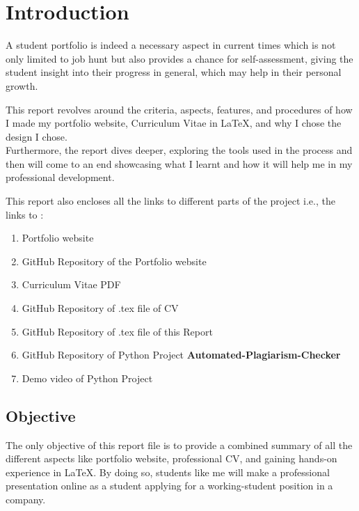 \documentclass{report}
\begin{document}
 

\tableofcontents
\newpage


\chapter{Introduction}
A  student portfolio is indeed a necessary aspect in current times which is not only limited to job hunt but also provides a chance for self-assessment, giving the student insight into their progress in general, which may help in their personal growth. \\
\par
This report revolves around the criteria, aspects, features, and procedures of how I made my portfolio website, Curriculum Vitae in LaTeX, and why I chose the design I chose.\\
Furthermore, the report dives deeper, exploring the tools used in the process and then will come to an end showcasing what I learnt and how it will help me in my professional development. \par
This report also encloses all the links to different parts of the project i.e., the links to :
\begin{enumerate}
   
    \item Portfolio website
    \item GitHub Repository of the Portfolio website
    \item Curriculum Vitae PDF
    \item GitHub Repository of .tex file of CV
    \item GitHub Repository of .tex file of this Report
    \item GitHub Repository of Python Project {\bf Automated-Plagiarism-Checker}
    \item Demo video of Python Project
    
\end{enumerate}

\section{Objective}
The only objective of this report file is to provide a combined summary of all the different aspects like portfolio website, professional CV, and gaining hands-on experience in LaTeX. By doing so, students like me will make a professional presentation online as a student applying for a working-student position in a company.
\end{document}
